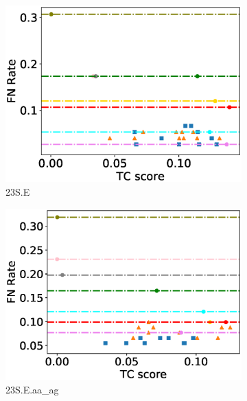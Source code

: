 \begin{figure}[!htbp]
\begin{adjustwidth}{-0.5cm}{-0.5cm}
		\begin{subfigure}{0.26\textwidth}
			\includegraphics[width=\columnwidth]{Figure/summary/precomputedInit/23S.E/fnrate_vs_tc}
			\caption{23S.E}
		\end{subfigure}    
		\begin{subfigure}{0.26\textwidth}
			\includegraphics[width=\columnwidth]{Figure/summary/precomputedInit/23S.E.aa_ag/fnrate_vs_tc}
			\caption{23S.E.aa\_ag}
		\end{subfigure}
		\begin{subfigure}{0.26\textwidth}

\end{subfigure}
\end{adjustwidth}
\end{figure}
